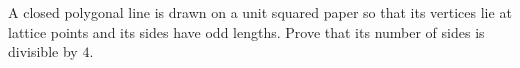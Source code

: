A closed polygonal line is drawn on a unit squared paper so that its vertices lie at lattice points and its sides have odd lengths. Prove that its number of sides is divisible by $4$.